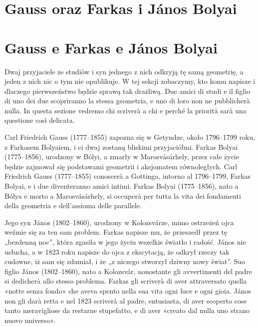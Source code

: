
\section{Gauss oraz Farkas i János Bolyai} %
\section{Gauss e Farkas e János Bolyai} %
\label{sekcja_gauss_bolyai}

Dwaj przyjaciele ze studiów i syn jednego z nich odkryją tę samą geometrię, a jeden z nich nic o tym nie opublikuje. %
W tej sekcji zobaczymy, kto komu napisze i dlaczego pierwszeństwo będzie sprawą tak drażliwą. %
Due amici di studi e il figlio di uno dei due scopriranno la stessa geometria, e uno di loro non ne pubblicherà nulla. %
In questa sezione vedremo chi scriverà a chi e perché la priorità sarà una questione così delicata. %

Carl Friedrich Gauss (1777--1855) zapozna się w Getyndze, około 1796--1799 roku, z Farkasem Bolyaiem, i ci dwaj zostaną bliskimi przyjaciółmi. %
Farkas Bolyai (1775--1856), urodzony w Bólyi, a zmarły w Marosvásárhely, przez całe życie będzie zajmował się podstawami geometrii i aksjomatem równoległych. %
Carl Friedrich Gauss (1777--1855) conoscerà a Gottinga, intorno al 1796--1799, Farkas Bolyai, e i due diventeranno amici intimi. %
Farkas Bolyai (1775--1856), nato a Bólya e morto a Marosvásárhely, si occuperà per tutta la vita dei fondamenti della geometria e dell'assioma delle parallele. %
%
%

Jego syn János (1802--1860), urodzony w Kolozsvárze, mimo ostrzeżeń ojca weźmie się za ten sam problem. %
Farkas napisze mu, że przeszedł przez tę „bezdenną noc'', która zgasiła w jego życiu wszelkie światło i radość. %
János nie usłucha, a w 1823 roku napisze do ojca z ekscytacją, że odkrył rzeczy tak cudowne, iż sam się zdumiał, i że „z niczego stworzył dziwny nowy świat''. %
Suo figlio János (1802--1860), nato a Kolozsvár, nonostante gli avvertimenti del padre si dedicherà allo stesso problema. %
Farkas gli scriverà di aver attraversato quella «notte senza fondo» che aveva spento nella sua vita ogni luce e ogni gioia. %
János non gli darà retta e nel 1823 scriverà al padre, entusiasta, di aver scoperto cose tanto meravigliose da restarne stupefatto, e di aver «creato dal nulla uno strano nuovo universo». %
%

